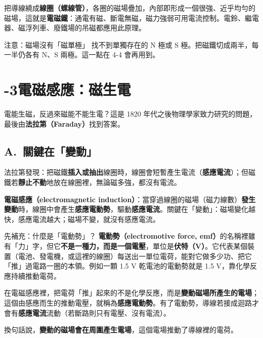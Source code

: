 \documentclass[11pt]{article}
\begin{document}
把導線繞成\textbf{線圈（螺線管）}，各圈的磁場疊加，內部即形成一個很強、近乎均勻的磁場，這就是\textbf{電磁鐵}：通電有磁、斷電無磁，磁力強弱可用電流控制。電鈴、繼電器、磁浮列車、廢鐵場的吊磁都應用此原理。

\begin{補充框}{注意：磁場沒有「磁單極」}
找不到單獨存在的 N 極或 S 極。把磁鐵切成兩半，每一半仍各有 N、S 兩極。這一點在 4-4 會再用到。
\end{補充框}

\section*{-3\quad 電磁感應：磁生電}

電能生磁，反過來磁能不能生電？這是 1820 年代之後物理學家致力研究的問題，最後由\textbf{法拉第（Faraday）}找到答案。

\subsection*{\sffamily A.\ 關鍵在「變動」}

法拉第發現：把磁鐵\textbf{插入或抽出}線圈時，線圈會短暫產生電流（\textbf{感應電流}）；但磁鐵若\textbf{靜止不動}地放在線圈裡，無論磁多強，都沒有電流。

\textbf{電磁感應（electromagnetic induction）}：當穿過線圈的磁場（磁力線數）\textbf{發生變動}時，線圈中會產生\textbf{感應電動勢}，驅動\textbf{感應電流}。關鍵在「變動」：磁場變化越快，感應電流越大；磁場不變，就沒有感應電流。

\begin{補充框}{先補充：什麼是「電動勢」？}
\textbf{電動勢（electromotive force, emf）}的名稱裡雖有「力」字，但它\textbf{不是一種力，而是一個電壓}，單位是\textbf{伏特（V）}。它代表某個裝置（電池、發電機，或這裡的線圈）每送出一單位電荷，能對它做多少功、把它「推」過電路一圈的本領。例如一顆 1.5 V 乾電池的電動勢就是 1.5 V，靠化學反應持續推動電荷。

在電磁感應裡，把電荷「推」起來的不是化學反應，而是\textbf{變動磁場所產生的電場}；這個由感應而生的推動電壓，就稱為\textbf{感應電動勢}。有了電動勢，導線若接成迴路才會有\textbf{感應電流}流動（若斷路則只有電壓、沒有電流）。
\end{補充框}

換句話說，\textbf{變動的磁場會在周圍產生電場}，這個電場推動了導線裡的電荷。

\end{document}
